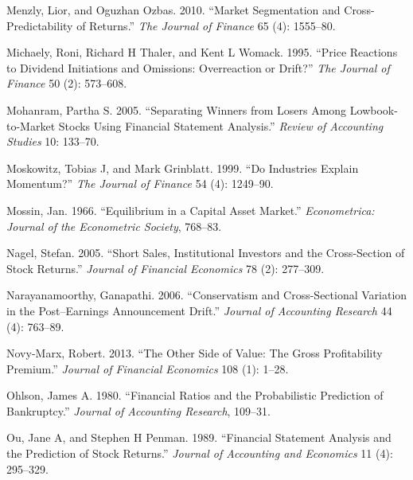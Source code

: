 \documentclass[
  letterpaper,
  DIV=11,
  numbers=noendperiod]{scrreprt}
\newlength{\cslhangindent}
\newlength{\cslentryspacingunit} %
\newenvironment{CSLReferences}[2] %
 {%
  \setlength{\parindent}{0pt}
  \ifodd #1
  \let\oldpar\par
  \def\par{\hangindent=\cslhangindent\oldpar}
  \fi
  \setlength{\parskip}{#2\cslentryspacingunit}
 }%
 {}
\begin{document}
\begin{CSLReferences}{1}{0}
\leavevmode{}%
Menzly, Lior, and Oguzhan Ozbas. 2010. {``Market Segmentation and
Cross-Predictability of Returns.''} \emph{The Journal of Finance} 65
(4): 1555--80.

\leavevmode{}%
Michaely, Roni, Richard H Thaler, and Kent L Womack. 1995. {``Price
Reactions to Dividend Initiations and Omissions: Overreaction or
Drift?''} \emph{The Journal of Finance} 50 (2): 573--608.

\leavevmode{}%
Mohanram, Partha S. 2005. {``Separating Winners from Losers Among
Lowbook-to-Market Stocks Using Financial Statement Analysis.''}
\emph{Review of Accounting Studies} 10: 133--70.

\leavevmode{}%
Moskowitz, Tobias J, and Mark Grinblatt. 1999. {``Do Industries Explain
Momentum?''} \emph{The Journal of Finance} 54 (4): 1249--90.

\leavevmode{}%
Mossin, Jan. 1966. {``Equilibrium in a Capital Asset Market.''}
\emph{Econometrica: Journal of the Econometric Society}, 768--83.

\leavevmode{}%
Nagel, Stefan. 2005. {``Short Sales, Institutional Investors and the
Cross-Section of Stock Returns.''} \emph{Journal of Financial Economics}
78 (2): 277--309.

\leavevmode{}%
Narayanamoorthy, Ganapathi. 2006. {``Conservatism and Cross-Sectional
Variation in the Post--Earnings Announcement Drift.''} \emph{Journal of
Accounting Research} 44 (4): 763--89.

\leavevmode{}%
Novy-Marx, Robert. 2013. {``The Other Side of Value: The Gross
Profitability Premium.''} \emph{Journal of Financial Economics} 108 (1):
1--28.

\leavevmode{}%
Ohlson, James A. 1980. {``Financial Ratios and the Probabilistic
Prediction of Bankruptcy.''} \emph{Journal of Accounting Research},
109--31.

\leavevmode{}%
Ou, Jane A, and Stephen H Penman. 1989. {``Financial Statement Analysis
and the Prediction of Stock Returns.''} \emph{Journal of Accounting and
Economics} 11 (4): 295--329.


\end{CSLReferences}
\end{document}
